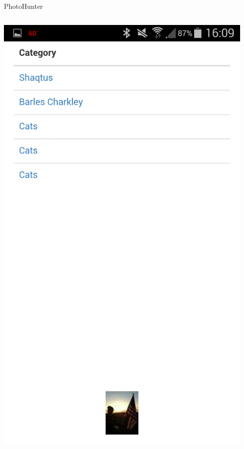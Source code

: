 \documentclass[aspectratio=169]{beamer}
\begin{document}
\begin{frame}{PhotoHunter}
  \begin{columns}[c]
    \begin{column}{0.3\columnwidth}
      \centering
      \includegraphics[width=\textwidth,height=\textheight,keepaspectratio]{photohunter/list}
    \end{column}
    \begin{column}{0.3\columnwidth}
      \centering

\end{column}
\end{columns}
\end{frame}
\end{document}
